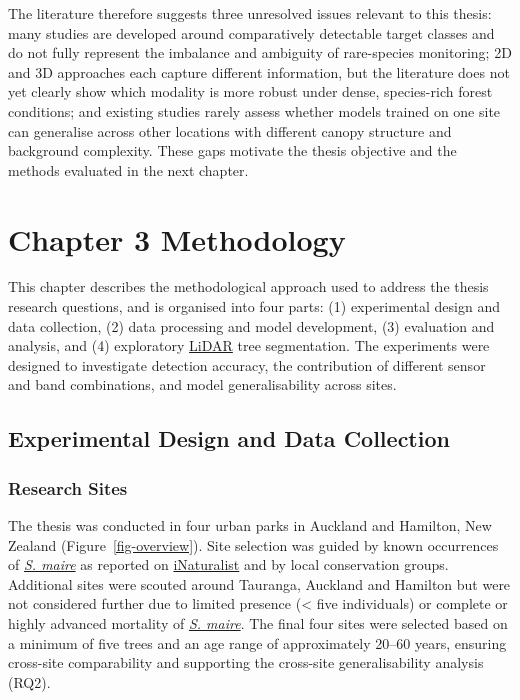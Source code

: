 \documentclass[
]{scrreprt}
\begin{document}
The literature therefore suggests three unresolved issues relevant to
this thesis: many studies are developed around comparatively detectable
target classes and do not fully represent the imbalance and ambiguity of
rare-species monitoring; 2D and 3D approaches each capture different
information, but the literature does not yet clearly show which modality
is more robust under dense, species-rich forest conditions; and existing
studies rarely assess whether models trained on one site can generalise
across other locations with different canopy structure and background
complexity. These gaps motivate the thesis objective and the methods
evaluated in the next chapter.

\chapter{Chapter 3 Methodology}\label{methodology}

This chapter describes the methodological approach used to address the
thesis research questions, and is organised into four parts: (1)
experimental design and data collection, (2) data processing and model
development, (3) evaluation and analysis, and (4) exploratory
\hyperref[acronyms_LiDAR]{LiDAR} tree segmentation. The experiments were
designed to investigate detection accuracy, the contribution of
different sensor and band combinations, and model generalisability
across sites.

\section{Experimental Design and Data
Collection}\label{experimental-design-and-data-collection}

\subsection{Research Sites}\label{sec-research_sites}

The thesis was conducted in four urban parks in Auckland and Hamilton,
New Zealand (Figure~\ref{fig-overview}). Site selection was guided by
known occurrences of \hyperref[acronyms_SM]{\emph{S. maire}} as reported
on \href{https://inaturalist.nz/taxa/406378-Syzygium-maire}{iNaturalist}
and by local conservation groups. Additional sites were scouted around
Tauranga, Auckland and Hamilton but were not considered further due to
limited presence (\textless{} five individuals) or complete or highly
advanced mortality of \hyperref[acronyms_SM]{\emph{S. maire}}. The final
four sites were selected based on a minimum of five trees and an age
range of approximately 20--60 years, ensuring cross-site comparability
and supporting the cross-site generalisability analysis (RQ2).
\end{document}
